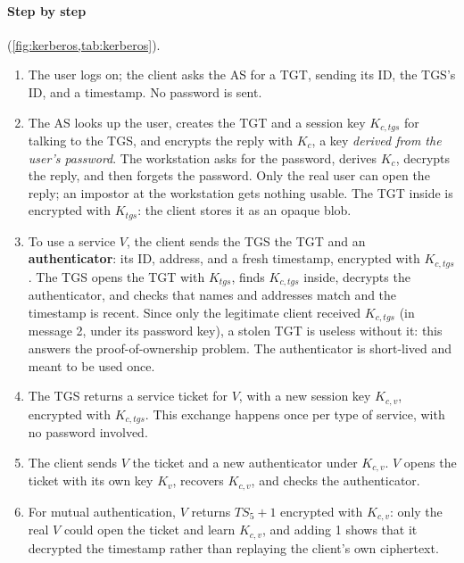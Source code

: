 \paragraph{Step by step} (\cref{fig:kerberos,tab:kerberos}).
\begin{enumerate}
    \item The user logs on; the client asks the AS for a TGT, sending its ID, the TGS's ID, and a timestamp. No password is sent.
    \item The AS looks up the user, creates the TGT and a session key $K_{c,tgs}$ for talking to the TGS, and encrypts the reply with $K_c$, a key \emph{derived from the user's password}. The workstation asks for the password, derives $K_c$, decrypts the reply, and then forgets the password. Only the real user can open the reply; an impostor at the workstation gets nothing usable. The TGT inside is encrypted with $K_{tgs}$: the client stores it as an opaque blob.
    \item To use a service $V$, the client sends the TGS the TGT and an \textbf{authenticator}: its ID, address, and a fresh timestamp, encrypted with $K_{c,tgs}$. The TGS opens the TGT with $K_{tgs}$, finds $K_{c,tgs}$ inside, decrypts the authenticator, and checks that names and addresses match and the timestamp is recent. Since only the legitimate client received $K_{c,tgs}$ (in message 2, under its password key), a stolen TGT is useless without it: this answers the proof-of-ownership problem. The authenticator is short-lived and meant to be used once.
    \item The TGS returns a service ticket for $V$, with a new session key $K_{c,v}$, encrypted with $K_{c,tgs}$. This exchange happens once per type of service, with no password involved.
    \item The client sends $V$ the ticket and a new authenticator under $K_{c,v}$. $V$ opens the ticket with its own key $K_v$, recovers $K_{c,v}$, and checks the authenticator.
    \item For mutual authentication, $V$ returns $TS_5 + 1$ encrypted with $K_{c,v}$: only the real $V$ could open the ticket and learn $K_{c,v}$, and adding 1 shows that it decrypted the timestamp rather than replaying the client's own ciphertext.
\end{enumerate}
